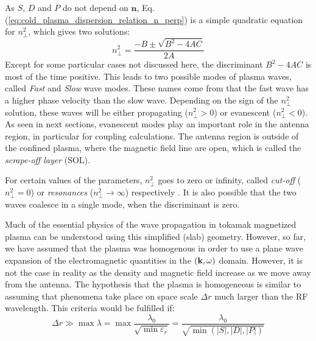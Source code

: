 As $S$, $D$ and $P$ do not depend on $\mathbf{n}$, Eq.(\ref{eq:cold_plasma_dispersion_relation_n_perp}) is a simple quadratic equation for $n_\perp^2$, which gives two solutions:
\begin{equation}
	n_\perp^2 
	=
	\frac{-B \pm  \sqrt{B^2 - 4AC}}{2A}
	\label{eq:nperp_solution_general}
\end{equation}
Except for some particular cases not discussed here, the discriminant $B^2 - 4AC$ is most of the time positive. This leads to two possible modes of plasma waves, called \textit{Fast} and \textit{Slow} wave modes. These names come from that the fast wave has a higher phase velocity than the slow wave. Depending on the sign of the $n_\perp^2$ solution, these waves will be either propagating ($n_\perp^2>0$) or evanescent ($n_\perp^2<0$). As seen in next sections, evanescent modes play an important role in the antenna region, in particular for coupling calculations. The antenna region is outside of the confined plasma, where the magnetic field line are open, which is called the \textit{scrape-off layer} (SOL). 


For certain values of the parameters, $n_\perp^2$ goes to zero or infinity, called \textit{cut-off} ($n_\perp^2 = 0$) or \textit{resonances} ($n_\perp^2\to\infty$) respectively . It is also possible that the two waves coalesce in a single mode, when the discriminant is zero. 

Much of the essential physics of the wave propagation in tokamak magnetized plasma can be understood using this simplified (slab) geometry. However, so far, we have assumed that the plasma was homogenous in order to use a plane wave expansion of the electromagnetic quantities in the $({\mathbf k},\omega)$ domain. However, it is not the case in reality as the density and magnetic field increase as we move away from the antenna. The hypothesis that the plasma is homogeneous is similar to assuming that phenomena take place on space scale $\Delta r$ much larger than the RF wavelength. This criteria would be fulfilled if:
\begin{equation}
	\Delta r \gg \max\lambda 
	= 
	\max \frac{\lambda_0}{\sqrt{\min \varepsilon_{r}}}
	=
	\frac{\lambda_0}{\sqrt{\min\left(|S|,|D|,|P|\right)}}
\end{equation}




